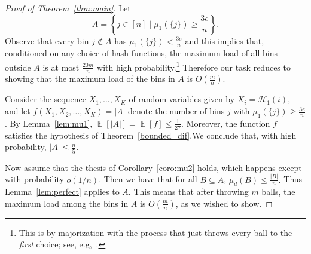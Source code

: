 \documentclass[10pt,conference,letterpaper]{IEEEtran}
\newcommand{\hash}[1]{\ensuremath{\mathcal{H}_{#1}}\xspace}
\newcommand{\keysize}{K\xspace}
\DeclareMathOperator*{\expect}{\mathbb{E}}
\begin{document}
\begin{proof}[Proof of Theorem~\ref{thm:main}]
Let $$A = \left\{j \in [n] \mid \mu_1(\{j\}) \ge \frac{3 e}{n}\right\}.$$
Observe that every bin $j \notin A$ has $\mu_1(\{j\}) < \frac{3 e}{n}$ and this implies that, conditioned on any choice of hash functions, the maximum load of all bins outside $A$ is
at most $\frac{20 m}{n}$ with high probability.\footnote{This is by majorization with the process that just throws every ball to the \emph{first}
    choice; see, e.g,~\citet{azar1999balanced-allocations}.} Therefore our task reduces to showing that the maximum load of the bins in $A$ is $O(\frac{m}{n})$.

Consider the sequence $X_1, \ldots, X_\keysize$ of random variables given by $X_i = \hash{1}(i)$, and let $f(X_1, X_2,
        \ldots, X_\keysize) = |A|$ denote the number of bins $j$ with $\mu_1(\{j\}) \ge \frac{3 e}{n}$.
By Lemma~\ref{lem:mu1}, 
$ \expect[|A|] = \expect[ f ] \le \frac{1}{27} $.
Moreover, the function $f$
satisfies the hypothesis of Theorem~\ref{bounded_dif}.We conclude that, with high probability, $|A| \le \frac{n}{5}.$

Now assume that the thesis of Corollary~\ref{coro:mu2} holds, which happens except with probability $o(1/n)$.
Then we have that for all $B \subseteq A$, $\mu_d(B) \le \frac{|B|}{n}.$
Thus Lemma~\ref{lem:perfect} applies to $A$. This means that after throwing $m$ balls, the maximum load among the bins in $A$ is $O(\frac{m}{n})$, as
we wished to show.
\end{proof}
\end{document}

